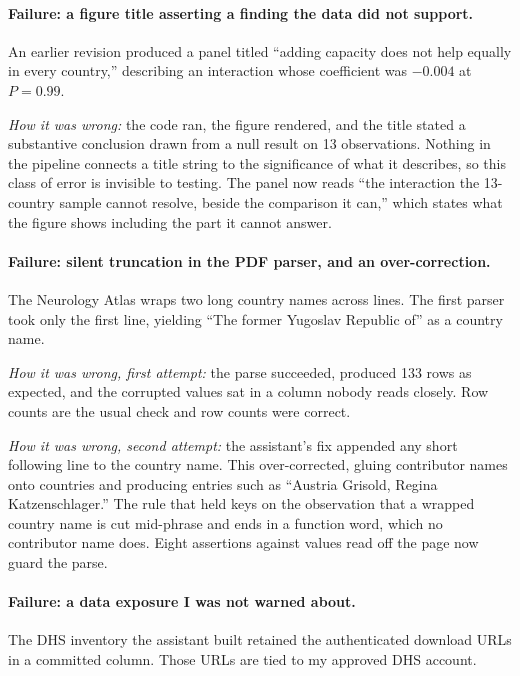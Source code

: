 \documentclass[10pt]{article}
\begin{document}
\paragraph{Failure: a figure title asserting a finding the data did not support.}
An earlier revision produced a panel titled ``adding capacity does not help
equally in every country,'' describing an interaction whose coefficient was
$-0.004$ at $P = 0.99$.

\emph{How it was wrong:} the code ran, the figure rendered, and the title stated
a substantive conclusion drawn from a null result on 13 observations. Nothing in
the pipeline connects a title string to the significance of what it describes,
so this class of error is invisible to testing. The panel now reads ``the
interaction the 13-country sample cannot resolve, beside the comparison it
can,'' which states what the figure shows including the part it cannot answer.

\paragraph{Failure: silent truncation in the PDF parser, and an over-correction.}
The Neurology Atlas wraps two long country names across lines. The first parser
took only the first line, yielding ``The former Yugoslav Republic of'' as a
country name.

\emph{How it was wrong, first attempt:} the parse succeeded, produced 133 rows
as expected, and the corrupted values sat in a column nobody reads closely. Row
counts are the usual check and row counts were correct.

\emph{How it was wrong, second attempt:} the assistant's fix appended any short
following line to the country name. This over-corrected, gluing contributor
names onto countries and producing entries such as ``Austria Grisold, Regina
Katzenschlager.'' The rule that held keys on the observation that a wrapped
country name is cut mid-phrase and ends in a function word, which no contributor
name does. Eight assertions against values read off the page now guard the
parse.

\paragraph{Failure: a data exposure I was not warned about.} The DHS inventory
the assistant built retained the authenticated download URLs in a committed
column. Those URLs are tied to my approved DHS account.
\end{document}
